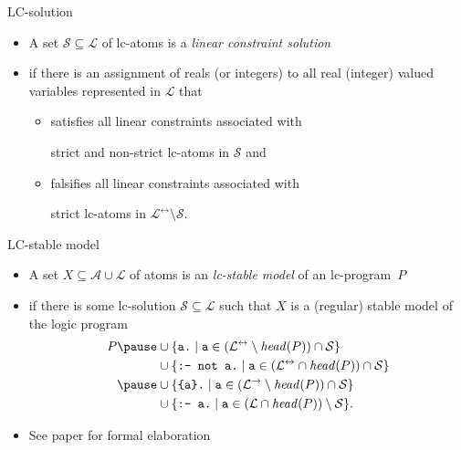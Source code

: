 \documentclass[t,fleqn]{beamer}
\begin{document}
\begin{frame}[fragile]{LC-solution}
  \begin{itemize}
  \item A set
    \(
    \mathcal{S}\subseteq\mathcal{L}
    \)
    of lc-atoms
    is a \emph{linear constraint solution}
    \smallskip
  \item []
    if there is an assignment of reals (or integers) to all real (integer) valued variables represented in $\mathcal{L}$ that
    \medskip
    \begin{itemize}\normalsize
    \item satisfies all linear constraints associated with\par strict and non-strict lc-atoms in $\mathcal{S}$ and
    \medskip
    \item falsifies all linear constraints associated with\par strict                lc-atoms in $\mathcal{L}^\leftrightarrow\setminus\mathcal{S}$.
    \end{itemize}
  \end{itemize}
\end{frame}
\begin{frame}[fragile]{LC-stable model}
  \begin{itemize}
  \item 
    A set $X\subseteq\mathcal{A}\cup\mathcal{L}$ of atoms
    is an \emph{lc-stable model} of an lc-program~$P$
    \smallskip
  \item []
    if there is some lc-solution $\mathcal{S}\subseteq\mathcal{L}$ such that
    $X$ is a (regular) stable model of the logic program
    \pause
    \smallskip
\newcommand{\code}[1]{\text{\texttt{#1}}}
\begin{align*}
P\pause
&{}\cup
\{\code{a.}       \mid \code{a}\in (\mathcal{L}^\leftrightarrow\setminus\head{P})\cap \mathcal{S}\}\\
&{}\cup
\{\code{:- not a.}\mid \code{a}\in (\mathcal{L}^\leftrightarrow\cap\head{P})\cap \mathcal{S}\}
\\\pause
&{}\cup
\{\code{\{a\}.}   \mid \code{a}\in (\mathcal{L}^\rightarrow\setminus\head{P})\cap \mathcal{S}\}\\
&{}\cup
\{\code{:- a.}    \mid \code{a}\in (\mathcal{L}\cap\head{P})\setminus \mathcal{S}\}\rlap{.}
\end{align*}
\smallskip
\item<5-> See paper for formal elaboration
\end{itemize}
\end{frame}
\end{document}
